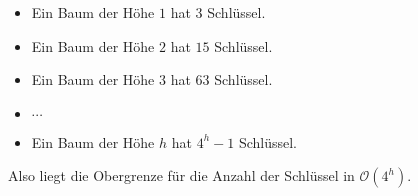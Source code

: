 \documentclass{bschlangaul-aufgabe}
\begin{document}
\begin{enumerate}
\begin{bAntwort}
\begin{itemize}
\item Ein Baum der Höhe $1$ hat $3$ Schlüssel.
\item Ein Baum der Höhe $2$ hat $15$ Schlüssel.
\item Ein Baum der Höhe $3$ hat $63$ Schlüssel.
\item $\cdots$
\item Ein Baum der Höhe $h$ hat $4^h - 1$ Schlüssel.
\end{itemize}

Also liegt die Obergrenze für die Anzahl der Schlüssel in
$\mathcal{O}(4^h)$.
\end{bAntwort}

\end{enumerate}
\end{document}
